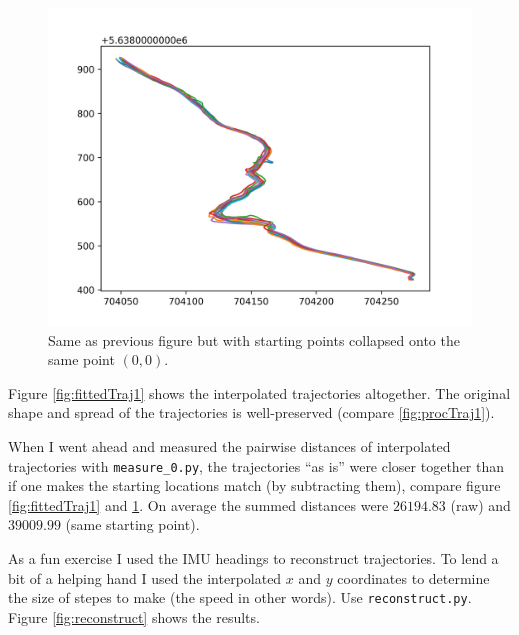 \documentclass[a4]{article}
\begin{document}
\begin{figure}
  \includegraphics[width=\textwidth]{figures/fitted_trajectories_onepanel.png}
  \caption{\label{fig:fittedTraj2} Same as previous figure but with
    starting points collapsed onto the same point $(0,0)$.
    }
\end{figure}

Figure \ref{fig:fittedTraj1} shows the interpolated trajectories
altogether. The original shape and spread of the trajectories is
well-preserved (compare \ref{fig:procTraj1}).


When I went ahead and measured the pairwise distances of interpolated
trajectories with \verb+measure_0.py+, the trajectories ``as is'' were
closer together than if one makes the starting locations match (by
subtracting them), compare figure \ref{fig:fittedTraj1} and \ref{fig:fittedTraj2}. On average the summed distances were $26194.83$ (raw)
and $39009.99$ (same starting point).

As a fun exercise I used the IMU headings to reconstruct
trajectories. To lend a bit of a helping hand I used the interpolated
$x$ and $y$ coordinates to determine the size of stepes to make (the
speed in other words). Use \verb+reconstruct.py+. Figure \ref{fig:reconstruct} shows the results.
\end{document}
